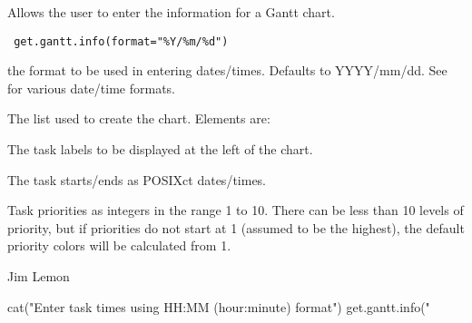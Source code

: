 \begin{Description}\relax
Allows the user to enter the information for a Gantt chart.
\end{Description}
\begin{Usage}
\begin{verbatim}
 get.gantt.info(format="%Y/%m/%d")
\end{verbatim}
\end{Usage}
\begin{Arguments}
\begin{ldescription}
\item[\code{format}] the format to be used in entering dates/times. Defaults to
YYYY/mm/dd. See  for various date/time formats.
\end{ldescription}
\end{Arguments}
\begin{Value}
The list used to create the chart. Elements are:
\begin{ldescription}
\item[\code{labels}] The task labels to be displayed at the left of the chart.
\item[\code{starts,ends}] The task starts/ends as POSIXct dates/times.
\item[\code{priorities}] Task priorities as integers in the range 1 to 10.
There can be less than 10 levels of priority, but if priorities do
not start at 1 (assumed to be the highest), the default priority colors
will be calculated from 1.
\end{ldescription}
\end{Value}
\begin{Author}\relax
Jim Lemon
\end{Author}
\begin{SeeAlso}\relax
{}
\end{SeeAlso}
\begin{Examples}
\begin{ExampleCode}
 cat("Enter task times using HH:MM (hour:minute) format\n")
 get.gantt.info("%
\end{ExampleCode}
\end{Examples}


